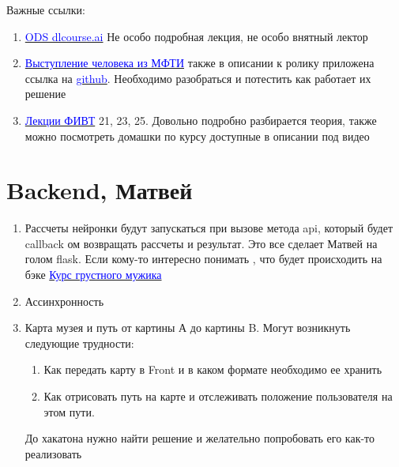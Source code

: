 \documentclass[11pt]{article}
\begin{document}
Важные ссылки:
\begin{enumerate}
\item \href{https://www.youtube.com/watch?v=JpS0LzEWr-4}{\textcolor{blue}{ODS dlcourse.ai}} Не особо подробная лекция, не особо внятный лектор 
\item \href{https://www.youtube.com/watch?v=eke2h9fGtu0}{\textcolor{blue}{Выступление человека из МФТИ}} также в описании к ролику приложена ссылка на \href{https://github.com/nsu-ai-team/voxforge_ru_sphinx_experiments}{\textcolor{blue}{github}}. Необходимо разобраться и потестить как работает их решение
\item \href{https://www.youtube.com/playlist?list=PL0Ks75aof3ThkitsZbUOEQg7Ybl5kB_s3}{\textcolor{blue}{Лекции ФИВТ}} 21, 23, 25. Довольно подробно разбирается теория, также можно посмотреть домашки по курсу доступные в описании под видео

\end{enumerate}

\section{Backend, {Матвей}}

\begin{enumerate}

\item Рассчеты нейронки будут запускаться при вызове метода api, который будет callback ом возвращать рассчеты и результат. Это все сделает Матвей на голом flask. Если кому-то интересно понимать , что будет происходить на бэке \href{https://blog.miguelgrinberg.com/post/the-flask-mega-tutorial-part-i-hello-world}{\textcolor{blue}{Курс грустного мужика}}
\item Ассинхронность 
\item Карта музея и путь от картины А до картины B. Могут возникнуть следующие трудности:
\begin{enumerate}
\item Как передать карту в Front и в каком формате необходимо ее хранить 
\item Как отрисовать путь на карте и отслеживать положение пользователя на этом пути. 
\end{enumerate}
До хакатона нужно найти решение и желательно попробовать его как-то реализовать
\end{enumerate}
\end{document}

